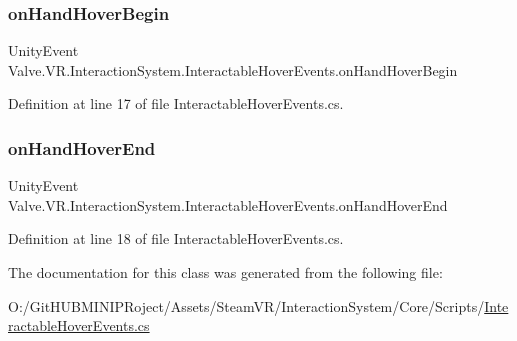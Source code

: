 \subsubsection{\texorpdfstring{onHandHoverBegin}{onHandHoverBegin}}
{\footnotesize\ttfamily Unity\+Event Valve.\+V\+R.\+Interaction\+System.\+Interactable\+Hover\+Events.\+on\+Hand\+Hover\+Begin}



Definition at line 17 of file Interactable\+Hover\+Events.\+cs.

\mbox{\label{class_valve_1_1_v_r_1_1_interaction_system_1_1_interactable_hover_events_a1bc46e244cf67d56193720bcfd949553}} 
\subsubsection{\texorpdfstring{onHandHoverEnd}{onHandHoverEnd}}
{\footnotesize\ttfamily Unity\+Event Valve.\+V\+R.\+Interaction\+System.\+Interactable\+Hover\+Events.\+on\+Hand\+Hover\+End}



Definition at line 18 of file Interactable\+Hover\+Events.\+cs.



The documentation for this class was generated from the following file\+:\begin{DoxyCompactItemize}
\item 
O\+:/\+Git\+H\+U\+B\+M\+I\+N\+I\+P\+Roject/\+Assets/\+Steam\+V\+R/\+Interaction\+System/\+Core/\+Scripts/\mbox{\hyperlink{_interactable_hover_events_8cs}{Interactable\+Hover\+Events.\+cs}}\end{DoxyCompactItemize}

